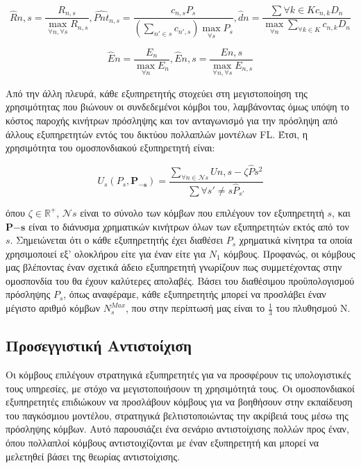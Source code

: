 \[\hat{R}{n,s} = \frac{R_{n,s}}{\max \limits_{\forall n, \forall s} { R_{n,s} }}, \hat{Pnt}_{n,s} = \frac{c_{n,s}P_s}{(\sum \limits_{n'\in s} c_{n',s}) \max \limits_{\forall s} P_s}, \hat{d}{n} = \frac{\sum \limits{\forall k \in K} c_{n,k} D_n}{\max \limits_{\forall n} { \sum \limits_{\forall k \in K} c_{n,k} D_n }}\]

\[\hat{E}{n} = \frac{E_{n}}{\max \limits_{\forall n} { E_{n} }},  \hat{E}{n,s} = \frac{E{n,s}}{\max \limits_{\forall n, \forall s} { E_{n,s} }}\]

Από την άλλη πλευρά, κάθε εξυπηρετητής στοχεύει στη μεγιστοποίηση της χρησιμότητας που βιώνουν οι συνδεδεμένοι κόμβοι του, λαμβάνοντας όμως υπόψη το κόστος παροχής κινήτρων πρόσληψης και τον ανταγωνισμό για την πρόσληψη από άλλους εξυπηρετητών εντός του δικτύου πολλαπλών μοντέλων FL. Έτσι, η χρησιμότητα του ομοσπονδιακού εξυπηρετητή είναι:

\vspace{-5pt}

\begin{equation}
U_s(P_s, \mathbf{P_{-s}}) = \frac{\sum\limits_{\forall n\in \mathcal{N}s} U{n,s} - \zeta \hat{P}s^2}{\sum\limits{\forall s'\neq s} \hat{P}_{s'}}
\label{eq8}
\end{equation}

\vspace{-5pt}

\noindent
όπου $\zeta \in \mathbb{R}^+$, $\mathcal{N}s$ είναι το σύνολο των κόμβων που επιλέγουν τον εξυπηρετητή $s$, και $\mathbf{P{-s}}$ είναι το διάνυσμα χρηματικών κινήτρων όλων των εξυπηρετητών εκτός από τον $s$. Σημειώνεται ότι ο κάθε εξυπηρετητής έχει διαθέσει $P_s$ χρηματικά κίνητρα τα οποία χρησιμοποιεί εξ' ολοκλήρου είτε για έναν είτε για $Ν_1$ κόμβους. Προφανώς, οι κόμβους μας βλέποντας έναν σχετικά άδειο εξυπηρετητή γνωρίζουν πως συμμετέχοντας στην ομοσπονδία του θα έχουν καλύτερες απολαβές. Βάσει του διαθέσιμου προϋπολογισμού πρόσληψης $P_s$, όπως αναφέραμε, κάθε εξυπηρετητής μπορεί να προσλάβει έναν μέγιστο αριθμό κόμβων $N_s^{Max}$, που στην περίπτωσή μας είναι το $\frac{1}{3}$ του πλυθησμού N.

\subsection{Προσεγγιστική Αντιστοίχιση}

Οι κόμβους επιλέγουν στρατηγικά εξυπηρετητές για να προσφέρουν τις υπολογιστικές τους υπηρεσίες, με στόχο να μεγιστοποιήσουν τη χρησιμότητά τους. Οι ομοσπονδιακοί εξυπηρετητές επιδιώκουν να προσλάβουν κόμβους για να βοηθήσουν στην εκπαίδευση του παγκόσμιου μοντέλου, στρατηγικά βελτιστοποιώντας την ακρίβειά τους μέσω της πρόσληψης κόμβων. Αυτό παρουσιάζει ένα σενάριο αντιστοίχισης πολλών προς έναν, όπου πολλαπλοί κόμβους αντιστοιχίζονται με έναν εξυπηρετητή και μπορεί να μελετηθεί βάσει της θεωρίας αντιστοίχισης.

